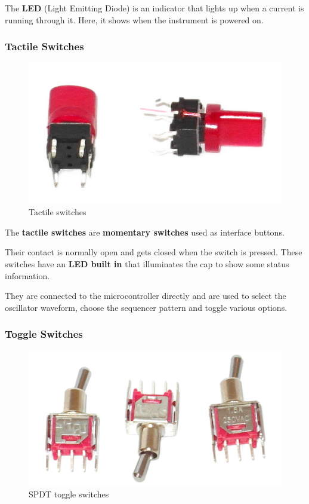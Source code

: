 \documentclass{scrartcl}
\begin{document}
The \textbf{LED} (Light Emitting Diode) is an indicator that lights up when a current is running through it.
Here, it shows when the instrument is powered on.

\subsubsection{Tactile Switches}

\begin{figure}[!ht]
    \begin{center}
        \includegraphics[scale=0.20]{assets/zekit-tacts.jpg}
        \caption{Tactile switches}
    \end{center}
\end{figure}

The \textbf{tactile switches} are \textbf{momentary switches} used as interface buttons.

Their contact is normally open and gets closed when the switch is pressed. These switches have an \textbf{LED built in} that illuminates the cap to show some status information.

They are connected to the microcontroller directly and are used to select the oscillator waveform, choose the sequencer pattern and toggle various options.

\subsubsection{Toggle Switches}

\begin{figure}[!ht]
    \begin{center}
        \includegraphics[scale=0.16]{assets/zekit-toggles.jpg}
        \caption{SPDT toggle switches}
    \end{center}
\end{figure}
\end{document}
